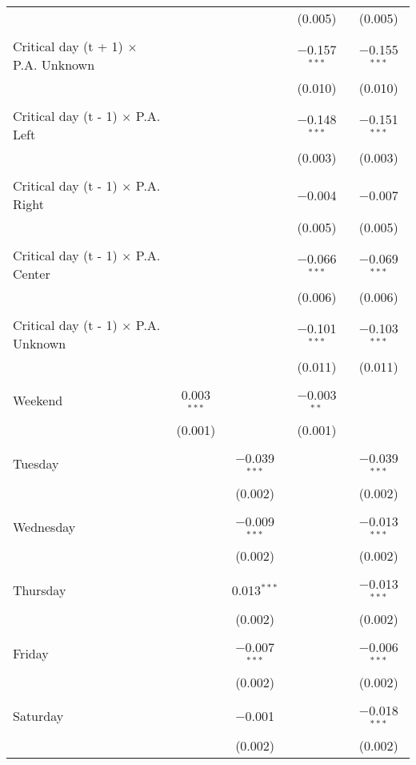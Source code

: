 \documentclass[
]{article}
\begin{document}
\begin{table}[!htbp]
{\begin{tabular}{@{\extracolsep{5pt}}lcccc}
  &  &  & (0.005) & (0.005) \\ 
  & & & & \\ 
 Critical day (t + 1) $\times$ P.A. Unknown &  &  & $-$0.157$^{***}$ & $-$0.155$^{***}$ \\ 
  &  &  & (0.010) & (0.010) \\ 
  & & & & \\ 
 Critical day (t - 1) $\times$ P.A. Left &  &  & $-$0.148$^{***}$ & $-$0.151$^{***}$ \\ 
  &  &  & (0.003) & (0.003) \\ 
  & & & & \\ 
 Critical day (t - 1) $\times$ P.A. Right &  &  & $-$0.004 & $-$0.007 \\ 
  &  &  & (0.005) & (0.005) \\ 
  & & & & \\ 
 Critical day (t - 1) $\times$ P.A. Center &  &  & $-$0.066$^{***}$ & $-$0.069$^{***}$ \\ 
  &  &  & (0.006) & (0.006) \\ 
  & & & & \\ 
 Critical day (t - 1) $\times$ P.A. Unknown &  &  & $-$0.101$^{***}$ & $-$0.103$^{***}$ \\ 
  &  &  & (0.011) & (0.011) \\ 
  & & & & \\ 
 Weekend & 0.003$^{***}$ &  & $-$0.003$^{**}$ &  \\ 
  & (0.001) &  & (0.001) &  \\ 
  & & & & \\ 
 Tuesday &  & $-$0.039$^{***}$ &  & $-$0.039$^{***}$ \\ 
  &  & (0.002) &  & (0.002) \\ 
  & & & & \\ 
 Wednesday &  & $-$0.009$^{***}$ &  & $-$0.013$^{***}$ \\ 
  &  & (0.002) &  & (0.002) \\ 
  & & & & \\ 
 Thursday &  & 0.013$^{***}$ &  & $-$0.013$^{***}$ \\ 
  &  & (0.002) &  & (0.002) \\ 
  & & & & \\ 
 Friday &  & $-$0.007$^{***}$ &  & $-$0.006$^{***}$ \\ 
  &  & (0.002) &  & (0.002) \\ 
  & & & & \\ 
 Saturday &  & $-$0.001 &  & $-$0.018$^{***}$ \\ 
  &  & (0.002) &  & (0.002) \\ 

\end{tabular}}
\end{table}
\end{document}
